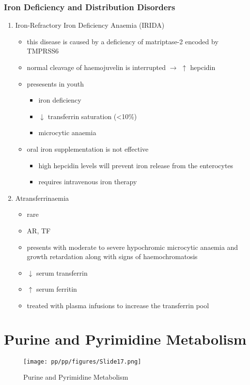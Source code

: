 \documentclass{scrartcl}
\begin{document}
\subsubsection{Iron Deficiency and Distribution Disorders}
\label{sec:org269b913}
\begin{enumerate}
\item Iron-Refractory Iron Deficiency Anaemia (IRIDA)
\label{sec:org75a0a63}
\begin{itemize}
\item this disease is caused by a deficiency of matriptase-2 encoded by TMPRSS6
\item normal cleavage of haemojuvelin is interrupted \(\to\) \(\uparrow\) hepcidin
\item presesents in youth
\begin{itemize}
\item iron deficiency
\item \(\downarrow\) transferrin saturation (<10\%)
\item microcytic anaemia
\end{itemize}
\item oral iron supplementation is not effective
\begin{itemize}
\item high hepcidin levels will prevent iron release from the
enterocytes
\item requires intravenous iron therapy
\end{itemize}
\end{itemize}

\item Atransferrinaemia
\label{sec:org71669d9}
\begin{itemize}
\item rare
\item AR, TF
\item presents with moderate to severe hypochromic microcytic anaemia and
growth retardation along with signs of haemochromatosis
\item \(\downarrow\) serum transferrin
\item \(\uparrow\) serum ferritin
\item treated with plasma infusions to increase the transferrin pool
\end{itemize}
\end{enumerate}
\section{Purine and Pyrimidine Metabolism}
\label{sec:org093ec9f}
\begin{figure}[htbp]
\centering
\texttt{[image: pp/pp/figures/Slide17.png]}
\caption{\label{fig:org461c245}Purine and Pyrimidine Metabolism}
\end{figure}
\end{document}
